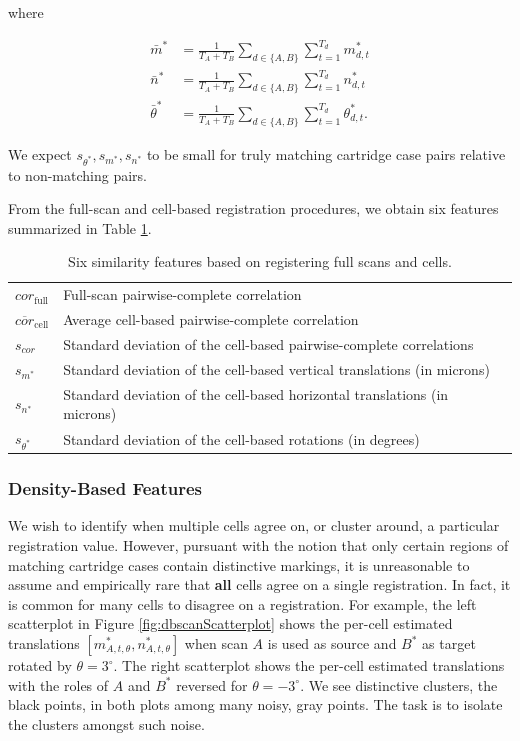 \documentclass[11pt,]{isuthesis}
\begin{document}
where

\begin{align*}
\bar{m}^* &= \frac{1}{T_A + T_B} \sum_{d \in \{A,B\}}\sum_{t=1}^{T_d} m^*_{d,t} \\
\bar{n}^* &= \frac{1}{T_A + T_B} \sum_{d \in \{A,B\}} \sum_{t=1}^{T_d} n^*_{d,t} \\
\bar{\theta}^* &= \frac{1}{T_A + T_B} \sum_{d \in \{A,B\}} \sum_{t=1}^{T_d} \theta^*_{d,t}.
\end{align*}

We expect \(s_{\theta^*}, s_{m^*},s_{n^*}\) to be small for truly matching cartridge case pairs relative to non-matching pairs.

From the full-scan and cell-based registration procedures, we obtain six features summarized in Table \ref{tab:registrationFeatures}.

\begin{table}[htbp]
\centering
\begin{tabular}{p{.11\linewidth} p{.7\linewidth}}
$cor_{\text{full}}$ & Full-scan pairwise-complete correlation \\
$\overline{cor}_{\text{cell}}$ & Average cell-based pairwise-complete correlation \\
$s_{cor}$ & Standard deviation of the cell-based pairwise-complete correlations \\
$s_{m^*}$ & Standard deviation of the cell-based vertical translations (in microns) \\
$s_{n^*}$ & Standard deviation of the cell-based horizontal translations (in microns) \\
$s_{\theta^*}$ & Standard deviation of the cell-based rotations (in degrees)
\end{tabular}
\caption{Six similarity features based on registering full scans and cells.}
\label{tab:registrationFeatures}
\end{table}

\hypertarget{density-based-features}{%
\subsubsection{Density-Based Features}\label{density-based-features}}

We wish to identify when multiple cells agree on, or cluster around, a particular registration value.
However, pursuant with the notion that only certain regions of matching cartridge cases contain distinctive markings, it is unreasonable to assume and empirically rare that \textbf{all} cells agree on a single registration.
In fact, it is common for many cells to disagree on a registration.
For example, the left scatterplot in Figure \ref{fig:dbscanScatterplot} shows the per-cell estimated translations \([m^*_{A,t,\theta}, n^*_{A,t,\theta}]\) when scan \(A\) is used as source and \(B^*\) as target rotated by \(\theta = 3^\circ\).
The right scatterplot shows the per-cell estimated translations with the roles of \(A\) and \(B^*\) reversed for \(\theta = -3^\circ\).
We see distinctive clusters, the black points, in both plots among many noisy, gray points.
The task is to isolate the clusters amongst such noise.
\end{document}
